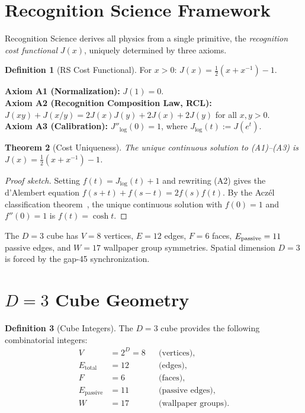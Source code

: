 \documentclass[12pt,a4paper]{article}
\newtheorem{theorem}{Theorem}[section]
\theoremstyle{definition}
\newtheorem{definition}[theorem]{Definition}
\theoremstyle{remark}
\begin{document}
\section{Recognition Science Framework}
\label{sec:framework}

Recognition Science derives all physics from a single primitive,
the \emph{recognition cost functional} $J(x)$, uniquely determined
by three axioms.

\begin{definition}[RS Cost Functional]
For $x > 0$: $J(x) = \tfrac{1}{2}(x + x^{-1}) - 1$.
\end{definition}

\noindent\textbf{Axiom A1 (Normalization):} $J(1) = 0$.\\
\textbf{Axiom A2 (Recognition Composition Law, RCL):}
$J(xy) + J(x/y) = 2J(x)J(y) + 2J(x) + 2J(y)$ for all $x, y > 0$.\\
\textbf{Axiom A3 (Calibration):} $J''_{\log}(0) = 1$, where
$J_{\log}(t) := J(e^t)$.

\begin{theorem}[Cost Uniqueness]
\label{thm:unique}
The unique continuous solution to \textup{(A1)--(A3)} is
$J(x) = \tfrac{1}{2}(x + x^{-1}) - 1$.
\end{theorem}

\begin{proof}[Proof sketch]
Setting $f(t) = J_{\log}(t) + 1$ and rewriting \textup{(A2)} gives the
d'Alembert equation $f(s+t) + f(s-t) = 2f(s)f(t)$.  By the Acz\'el
classification theorem~\cite{Aczel1966}, the unique continuous solution
with $f(0) = 1$ and $f''(0) = 1$ is $f(t) = \cosh t$.
\end{proof}

\noindent The $D = 3$ cube has $V = 8$ vertices, $E = 12$ edges, $F = 6$ faces,
$E_{\rm passive} = 11$ passive edges, and $W = 17$ wallpaper group symmetries.
Spatial dimension $D = 3$ is forced by the gap-45 synchronization.

\section{$D = 3$ Cube Geometry}
\label{sec:cube}

\begin{definition}[Cube Integers]
The $D = 3$ cube provides the following combinatorial integers:
\begin{align}
  V &= 2^D = 8 &&\text{(vertices)}, \\
  E_{\mathrm{total}} &= 12 &&\text{(edges)}, \\
  F &= 6 &&\text{(faces)}, \\
  E_{\mathrm{passive}} &= 11 &&\text{(passive edges)}, \\
  W &= 17 &&\text{(wallpaper groups)}.
\end{align}
\end{definition}
\end{document}
